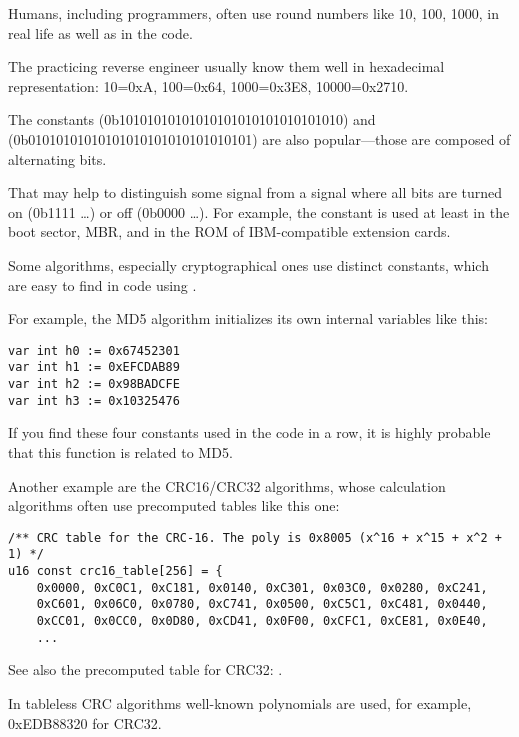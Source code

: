 
Humans, including programmers, often use round numbers like 10, 100, 1000, 
in real life as well as in the code.

The practicing reverse engineer usually know them well in hexadecimal representation:
10=0xA, 100=0x64, 1000=0x3E8, 10000=0x2710.

The constants  (0b10101010101010101010101010101010) and \\
 (0b01010101010101010101010101010101)  are also popular---those
are composed of alternating bits.

That may help to distinguish some signal from a signal where all bits are turned on (0b1111 \dots) or off (0b0000 \dots).
For example, the  constant
is used at least in the boot sector, \ac{MBR}, 
and in the \ac{ROM} of IBM-compatible extension cards.

Some algorithms, especially cryptographical ones use distinct constants, which are easy to find
in code using \IDA.


For example, the MD5 algorithm initializes its own internal variables like this:

\begin{verbatim}
var int h0 := 0x67452301
var int h1 := 0xEFCDAB89
var int h2 := 0x98BADCFE
var int h3 := 0x10325476
\end{verbatim}

If you find these four constants used in the code in a row, it is highly probable that this function is related to MD5.

\par Another example are the CRC16/CRC32 algorithms, 
whose calculation algorithms often use precomputed tables like this one:

\begin{lstlisting}[caption=linux/lib/crc16.c,style=customc]
/** CRC table for the CRC-16. The poly is 0x8005 (x^16 + x^15 + x^2 + 1) */
u16 const crc16_table[256] = {
	0x0000, 0xC0C1, 0xC181, 0x0140, 0xC301, 0x03C0, 0x0280, 0xC241,
	0xC601, 0x06C0, 0x0780, 0xC741, 0x0500, 0xC5C1, 0xC481, 0x0440,
	0xCC01, 0x0CC0, 0x0D80, 0xCD41, 0x0F00, 0xCFC1, 0xCE81, 0x0E40,
	...
\end{lstlisting}

See also the precomputed table for CRC32: .

In tableless CRC algorithms well-known polynomials are used, for example, 0xEDB88320 for CRC32.

